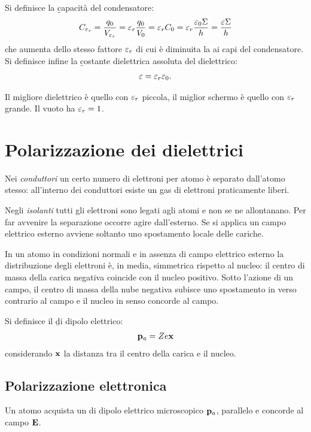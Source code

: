 Si definisce la \b{capacità del condensatore}:
\begin{equation}\begin{split}
C_{\varepsilon_r}=\frac{q_0}{V_{\varepsilon_r}}={\varepsilon_r}\frac{q_0}{V_0}={\varepsilon_r} C_0={\varepsilon_r}\frac{\varepsilon_0\Sigma}{h}=\frac{\varepsilon\Sigma}{h}
\end{split}\end{equation}
che aumenta dello stesso fattore ${\varepsilon_r}$ di cui è diminuita la \ddp ai capi del condensatore. Si definisce infine la \b{costante dielettrica assoluta del dielettrico}:
\begin{equation}\begin{split}
\varepsilon={\varepsilon_r}\varepsilon_0.
\end{split}\end{equation}

Il migliore dielettrico è quello con ${\varepsilon_r}$ piccola, il miglior schermo è quello con ${\varepsilon_r}$ grande. Il vuoto ha ${\varepsilon_r}=1$.

\section{Polarizzazione dei dielettrici}%
Nei \emph{conduttori} un certo numero di elettroni per atomo è separato dall'atomo stesso: all'interno dei conduttori esiste un gas di elettroni praticamente liberi.

Negli \emph{isolanti} tutti gli elettroni sono legati agli atomi e non se ne allontanano. Per far avvenire la separazione occorre agire dall'esterno. Se si applica un campo elettrico esterno avviene soltanto uno spostamento locale delle cariche.

In un atomo in condizioni normali e in assenza di campo elettrico esterno la distribuzione degli elettroni è, in media, simmetrica rispetto al nucleo: il centro di massa della carica negativa coincide con il nucleo positivo. Sotto l'azione di un campo, il centro di massa della nube negativa subisce uno spostamento in verso contrario al campo e il nucleo in senso concorde al campo.

Si definisce il \b{\mom di dipolo elettrico}:
\begin{equation}\begin{split}
\mathbf{p}_a=Ze\mathbf{x}
\end{split}\end{equation}
considerando $\mathbf{x}$ la distanza tra il centro della carica e il nucleo.

\subsection{Polarizzazione elettronica}
Un atomo acquista un \mom di dipolo elettrico microscopico $\mathbf{p}_a$, parallelo e concorde al campo $\mathbf{E}$.

